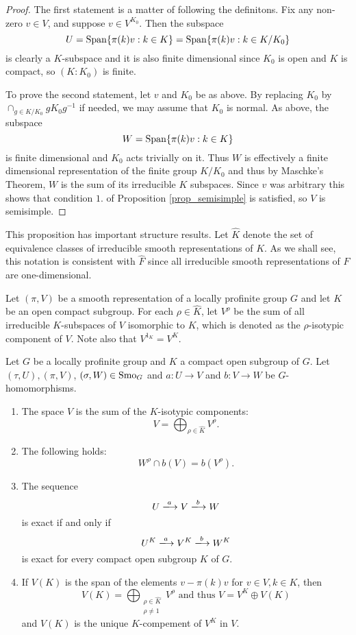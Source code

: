 \begin{proof}
    The first statement is a matter of following the definitons. Fix any non-zero $v\in V$, and suppose $v\in V^{K_0}$. Then the subspace 
    $$U=\mathrm{Span}\{\pi(k)v:k\in K\}=\mathrm{Span}\{\pi(k)v:k\in K/K_0\}$$
    is clearly a $K$-subspace and it is also finite dimensional since $K_0$ is open and $K$ is compact, so $(K:K_0)$ is finite.   

    To prove the second statement, let $v$ and $K_0$ be as above. By replacing $K_0$ by $\cap_{g\in K/K_0}gK_0g^{-1}$ if needed, we may assume that $K_0$ is normal. As above, the subspace 
    $$W=\mathrm{Span}\{\pi(k)v:k\in K\}$$
    is finite dimensional and $K_0$ acts trivially on it.
    Thus $W$ is effectively a finite dimensional representation of the finite group $K/K_0$ and thus by Maschke's Theorem, $W$ is the sum of its irreducible $K$ subspaces. Since $v$ was arbitrary this shows that condition $1.$ of Proposition \ref{prop_semisimple} is satisfied, so $V$ is semisimple.

\end{proof}

This proposition has important structure results. Let $\hat{K}$ denote the set of equivalence classes of irreducible smooth representations of $K$. As we shall see, this notation is consistent with $\hat{F}$ since all irreducible smooth representations of $F$ are one-dimensional.

Let $(\pi,V)$ be a smooth representation of a locally profinite group $G$ and let $K$ be an open compact subgroup. For each $\rho\in\hat{K}$, let $V^\rho$ be the sum of all irreducible $K$-subspaces of $V$ isomorphic to $K$, which is denoted as the $\rho$-isotypic component of $V$. Note also that $V^{1_K}=V^K$.

\begin{prop}
    Let $G$ be a locally profinite group and $K$ a compact open subgroup of $G$. Let $(\tau,U),(\pi,V)$, $(\sigma,W)\in\mathrm{Smo}_G$ and $a:U\rightarrow V$ and $b:V\rightarrow W$ be $G$-homomorphisms. 
    \begin{enumerate}
        \item The space $V$ is the sum of the $K$-isotypic components:
        $$V=\bigoplus_{\rho\in\hat{K}}V^\rho.$$
        \item The following holds:
        $$W^\rho\cap b(V)=b(V^\rho).$$
        \item The sequence
        $$U\xlongrightarrow{a} V\xlongrightarrow{b} W$$
        is exact if and only if 
        $$U^K\xlongrightarrow{a} V^K \xlongrightarrow{b} W^K$$
        is exact for every compact open subgroup $K$ of $G$.
        \item If $V(K)$ is the span of the elements $v-\pi(k)v$ for $v\in V, k\in K$, then
        $$V(K)=\bigoplus_{\substack{\rho\in\hat{K}\\\rho\neq 1}}V^\rho \text{ and thus } V=V^K\oplus V(K)$$
        and $V(K)$ is the unique $K$-compement of $V^K$ in $V$. 
    \end{enumerate}
\end{prop}

